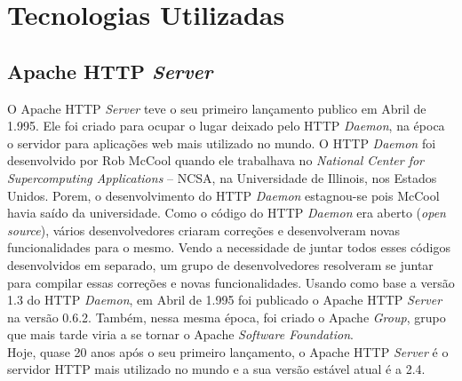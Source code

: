 \chapter{Tecnologias Utilizadas}\label{tecnologias_utilizadas}
\section{Apache HTTP \textit{Server}}
O Apache HTTP \textit{Server} teve o seu primeiro lançamento publico em Abril de 1.995. Ele foi criado para ocupar o lugar deixado pelo HTTP \textit{Daemon}, na época o servidor para aplicações web mais utilizado no mundo. O HTTP \textit{Daemon} foi desenvolvido por Rob McCool quando ele trabalhava no \textit{National Center for Supercomputing Applications} – NCSA, na Universidade de Illinois, nos Estados Unidos. Porem, o desenvolvimento do HTTP \textit{Daemon} estagnou-se pois McCool havia saído da universidade. Como o código do HTTP \textit{Daemon} era aberto (\textit{open source}), vários desenvolvedores criaram correções e desenvolveram novas funcionalidades para o mesmo. Vendo a necessidade de juntar todos esses códigos desenvolvidos em separado, um grupo de desenvolvedores resolveram se juntar para compilar essas correções e novas funcionalidades. Usando como base a versão 1.3 do HTTP \textit{Daemon}, em Abril de 1.995 foi publicado o Apache HTTP \textit{Server} na versão 0.6.2. Também, nessa mesma época, foi criado o Apache \textit{Group}, grupo que mais tarde viria a se tornar o Apache \textit{Software Foundation}.\\
Hoje, quase 20 anos após o seu primeiro lançamento, o Apache HTTP \textit{Server} é o servidor HTTP mais utilizado no mundo e a sua versão estável atual é a 2.4.\\
